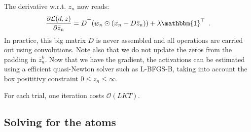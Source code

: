 \begin{appendices}
The derivative w.r.t. $z_n$ now reads:
\begin{equation}
\frac{\partial \mathcal{L}(d, z)}{\partial \bar{z}_n}
= D^\top(w_n \odot (x_n - D\bar{z}_n)) + \lambda \mathbbm{1}^\top \enspace .
\end{equation}
In practice, this big matrix $D$ is never assembled and all operations are carried out using convolutions. Note also that we do not update the zeros from the padding in $\bar{z}_n^k$. Now that we have the gradient, the activations can be estimated using a efficient quasi-Newton solver such as L-BFGS-B, taking into account the box posititivy constraint $0 \leq z_n \leq \infty$.

For each trial, one iteration costs $\mathcal{O}(LKT)$.

\subsection{Solving for the atoms}


\end{appendices}
